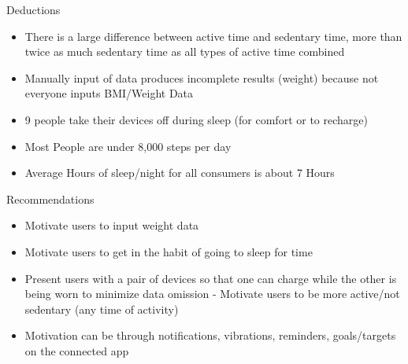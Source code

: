 \documentclass[
  ignorenonframetext,
]{beamer}
\providecommand{\tightlist}{%
  \setlength{\itemsep}{0pt}\setlength{\parskip}{0pt}}
\begin{document}
\begin{frame}{Deductions}
\protect\hypertarget{deductions}{}
\begin{itemize}
\tightlist
\item
  There is a large difference between active time and sedentary time,
  more than twice as much sedentary time as all types of active time
  combined
\item
  Manually input of data produces incomplete results (weight) because
  not everyone inputs BMI/Weight Data
\item
  9 people take their devices off during sleep (for comfort or to
  recharge)
\item
  Most People are under 8,000 steps per day
\item
  Average Hours of sleep/night for all consumers is about 7 Hours
\end{itemize}
\end{frame}

\begin{frame}{Recommendations}
\protect\hypertarget{recommendations}{}
\begin{itemize}
\tightlist
\item
  Motivate users to input weight data
\item
  Motivate users to get in the habit of going to sleep for time
\item
  Present users with a pair of devices so that one can charge while the
  other is being worn to minimize data omission - Motivate users to be
  more active/not sedentary (any time of activity)
\item
  Motivation can be through notifications, vibrations, reminders,
  goals/targets on the connected app
\end{itemize}
\end{frame}
\end{document}

